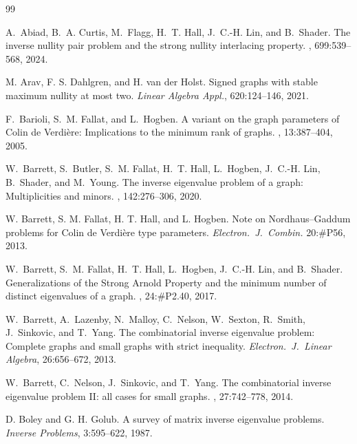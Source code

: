 \documentclass{article}
\theoremstyle{definition}
\begin{document}
\begin{thebibliography}{99}

A.~Abiad, B.~A. Curtis, M.~Flagg, H.~T. Hall, J.~C.-H. Lin, and B.~Shader.
\newblock The inverse nullity pair problem and the strong nullity interlacing property.
, 699:539--568, 2024.

M. Arav, F. S. Dahlgren, and H. van der Holst.
\newblock Signed graphs with stable maximum nullity at most two.
\newblock \emph{Linear Algebra Appl.}, 620:124--146, 2021.

F.~Barioli, S.~M. Fallat, and L.~Hogben.
\newblock A variant on the graph parameters of {C}olin de {V}erdi\`ere: Implications to the minimum rank of graphs.
, 13:387--404, 2005.

W.~Barrett, S.~Butler, S.~M. Fallat, H.~T. Hall, L.~Hogben, J.~C.-H. Lin, B.~Shader, and M.~Young.
\newblock The inverse eigenvalue problem of a graph: {M}ultiplicities and minors.
, 142:276--306, 2020.

W. Barrett, S. M. Fallat, H. T. Hall, and L. Hogben. 
\newblock Note on Nordhaus--Gaddum problems for Colin de Verdière type parameters. 
\newblock \emph{Electron.\ J.\ Combin.}  20:\#P56, 2013. 

W.~Barrett, S.~M. Fallat, H.~T. Hall, L.~Hogben, J.~C.-H. Lin, and B.~Shader.
\newblock Generalizations of the {S}trong {A}rnold {P}roperty and the minimum number of distinct eigenvalues of a graph.
, 24:\#P2.40, 2017.

W.~Barrett, A.~Lazenby, N.~Malloy, C.~Nelson, W.~Sexton, R.~Smith, J.~Sinkovic, and T.~Yang. 
\newblock The combinatorial inverse eigenvalue problem: Complete graphs and small graphs with strict inequality. \emph{Electron.\ J.\ Linear Algebra}, 26:656--672, 2013.

W.~Barrett, C.~Nelson, J.~Sinkovic, and T.~Yang.
\newblock The combinatorial inverse eigenvalue problem {II}: all cases for small graphs.
, 27:742--778, 2014.

D. Boley and G. H. Golub.
\newblock A survey of matrix inverse eigenvalue problems. 
\newblock \emph{Inverse Problems}, 3:595--622, 1987. 


\end{thebibliography}
\end{document}
